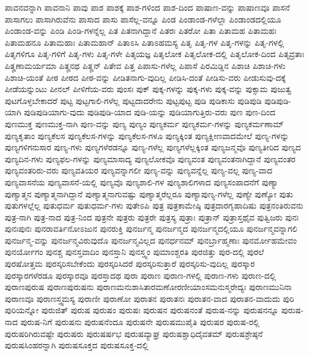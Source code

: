{ಪಾವನವನ್ನಾಗಿ
ಪಾವನಾನಿ
ಪಾವು
ಪಾಶ
ಪಾಶಕ್ಕೆ
ಪಾಶ-ಗಳಿಂದ
ಪಾಶ-ದಿಂದ
ಪಾಷಾಣ-ವನ್ನು
ಪಾಷಾಣವೂ
ಪಾಸನೆ
ಪಾಸಾಗಲು
ಪಾಸಾಗಿರುವೆನು
ಪಾಸಾದ
ಪಾಸು
ಪಾಸೆಲ್ಲ-ವನ್ನೂ
ಪಿಂಡ
ಪಿಂಡಾಂಡ-ಗಳೆಲ್ಲಾ
ಪಿಂಡಾಂಡದಲ್ಲಿಯೂ
ಪಿಂಡಾಂಡ-ವನ್ನು
ಪಿಂಡಿ
ಪಿಂಡಿ-ಗಳನ್ನೆಲ್ಲ
ಪಿತ
ಪಿತನಾಗಿದ್ದಾನೆ
ಪಿತರಃ
ಪಿತರೋ
ಪಿತಾ
ಪಿತಾಮಹ
ಪಿತಾಮಹಃ
ಪಿತಾಮಹನೂ
ಪಿತಾಮಹಾಃ
ಪಿತಾಮಹಾನ್
ಪಿತಾಽಸಿ
ಪಿತಾಽಹಮಸ್ಯ
ಪಿತೃ
ಪಿತೃ-ಗಳ
ಪಿತೃ-ಗಳನ್ನು
ಪಿತೃ-ಗಳಲ್ಲಿ
ಪಿತೃಗಳಿಗೂ
ಪಿತೃ-ಗಳಿಗೆ
ಪಿತೃ-ಗಳು
ಪಿತೃ-ಗಳೇ
ಪಿತೃಯಜ್ಞ
ಪಿತೃಲೋಕ
ಪಿತೃಲೋಕ-ದಲ್ಲಿ
ಪಿತೃಲೋಕ-ದಿಂದ
ಪಿತೃವ್ರತಾಃ
ಪಿತೄಣಾಮರ್ಯಮಾ
ಪಿತೄನಥ
ಪಿತೄನ್
ಪಿತೇವ
ಪಿತ್ತ
ಪಿಪಾಸು-ಗಳೆಲ್ಲ
ಪಿಪಾಸೆ
ಪಿರಮಿಡ್ಡಿನ
ಪಿಶಾಚಿ
ಪಿಶಾಚಿ-ಗಳು
ಪಿಶಾಚಿ-ಯಂತೆ
ಪೀಠ
ಪೀಠದ
ಪೀಠ-ವನ್ನು
ಪೀಡಿತನಾಗು-ವುದಿಲ್ಲ
ಪೀಡಿಸಿ-ದಂತೆ
ಪೀಡಿಸು-ವರು
ಪೀಡುಸುವು-ದಕ್ಕೆ
ಪೀಡೆಯನ್ನುಂಟು
ಪೀನಲ್
ಪೀಳಿಗೆಯ-ವರು
ಪುಂಸಃ
ಪುಕ್
ಪುಕ್ಕ-ಗಳನ್ನು
ಪುಕ್ಕ-ಗಳು
ಪುಕ್ಕ-ವನ್ನು
ಪುಕ್ಸಾಮ
ಪುಜುತ್ವ
ಪುಟಗೊಳ್ಳಬೇಕಾದರೆ
ಪುಟ್ಟ
ಪುಟ್ಟಗಾಲಿ-ಗಳೆಲ್ಲ
ಪುಟ್ಟದಾದರೇನು
ಪುಟ್ಟಪುಟ್ಟ
ಪುಡಿ
ಪುಡಿಕಾಸು
ಪುಡಿಪುಡಿ
ಪುಡಿಪುಡಿ-ಯಾಗಿ
ಪುಡಿಪುಡಿಯಾಗು-ವುದು
ಪುಡಿಪುಡಿ-ಯಾದ
ಪುಡಿ-ಯನ್ನು
ಪುಡಿಯಾಗುತ್ತಿರು-ವರು
ಪುಣ
ಪುಣ-ದಿಂದ
ಪುಣಮುಕ್ತ
ಪುಣಮುಕ್ತ-ನಾಗಿ
ಪುಣ-ವನ್ನು
ಪುಣ್ಯ
ಪುಣ್ಯಂ
ಪುಣ್ಯಕರ್ಮ
ಪುಣ್ಯಕರ್ಮ-ಗಳನ್ನು
ಪುಣ್ಯಕರ್ಮಣಾಮ್
ಪುಣ್ಯಕೃತಾಂ
ಪುಣ್ಯಕೆಲಸ
ಪುಣ್ಯಕೆಲಸ-ಗಳನ್ನು
ಪುಣ್ಯಕೆಲಸ-ಗಳೂ
ಪುಣ್ಯಕ್ಕಿಂತ
ಪುಣ್ಯಕ್ಷೀಣವಾದಮೇಲೆ
ಪುಣ್ಯ-ಗಳನ್ನು
ಪುಣ್ಯಗಳಿಗನುಸಾರ
ಪುಣ್ಯ-ಗಳು
ಪುಣ್ಯಗಳೆರಡನ್ನೂ
ಪುಣ್ಯ-ಗಳೆಲ್ಲ
ಪುಣ್ಯಗಳೆಲ್ಲಕ್ಕಿಂತ
ಪುಣ್ಯಜನ್ಮವೊ
ಪುಣ್ಯತೀರಿದ
ಪುಣ್ಯದ
ಪುಣ್ಯದಿನ-ಗಳು
ಪುಣ್ಯಫಲ-ಗಳನ್ನು
ಪುಣ್ಯಮಾಸಾದ್ಯ
ಪುಣ್ಯಲೋಕವೊ
ಪುಣ್ಯವಂತ
ಪುಣ್ಯವಂತನಾಗಿದ್ದಾನೆ
ಪುಣ್ಯವಂತರ
ಪುಣ್ಯವಂತರಿರು-ವರು
ಪುಣ್ಯವತಿಯರ
ಪುಣ್ಯವನ್ನಾಗಲೀ
ಪುಣ್ಯ-ವನ್ನು
ಪುಣ್ಯವನ್ನೆಲ್ಲ
ಪುಣ್ಯ-ವಲ್ಲ
ಪುಣ್ಯ-ವಾದ
ಪುಣ್ಯವಾಸನೆಯ
ಪುಣ್ಯವಾಸನೆ-ಯಲ್ಲಿ
ಪುಣ್ಯವೊ
ಪುಣ್ಯಶಾಲಿ-ಗಳ
ಪುಣ್ಯಶಾಲಿಗಳಾದ
ಪುಣ್ಯಸಂಪಾದನೆಗೆ
ಪುಣ್ಯಾ
ಪುಣ್ಯಾತ್ಮನ
ಪುಣ್ಯಾತ್ಮನಾಗಿದ್ದಾನೆ
ಪುಣ್ಯಾತ್ಮನಾಗುವಷ್ಟು
ಪುಣ್ಯಾತ್ಮರೆಲ್ಲರೂ
ಪುಣ್ಯಾಪುಣ್ಯ-ಗಳೆಲ್ಲ
ಪುಣ್ಯೇ
ಪುಣ್ಯೋ
ಪುತು
ಪುತುಗಳಲ್ಲೆಲ್ಲ
ಪುತುಧರ್ಮ
ಪುತುಧರ್ಮ-ಗಳು
ಪುತೇಽಪಿ
ಪುತ್ರ
ಪುತ್ರಕಾಮೇಷ್ಠಿ
ಪುತ್ರದಾರಗೃಹಾದಿಷು
ಪುತ್ರನಂತಿರುವನು
ಪುತ್ರ-ನಾಗಿ
ಪುತ್ರ-ನಾದ
ಪುತ್ರ-ನಿಂದ
ಪುತ್ರನೇ
ಪುತ್ರರು
ಪುತ್ರರೇ
ಪುತ್ರಸ್ಯ
ಪುತ್ರಾಃ
ಪುತ್ರಾನ್
ಪುತ್ರಾಸ್ತಥೈವ
ಪುತ್ವಿಜರು
ಪುನಃ
ಪುನಃಪುನಃ
ಪುನರಾವರ್ತಿನೋಽಜುನ
ಪುನರುಕ್ತಿ
ಪುನರ್ಜನ್ಮ
ಪುನರ್ಜನ್ಮದ
ಪುನರ್ಜನ್ಮದಲ್ಲಿಯೂ
ಪುನರ್ಜನ್ಮವನ್ನಾಗಲಿ
ಪುನರ್ಜನ್ಮ-ವನ್ನು
ಪುನರ್ಜನ್ಮವಿರುವುದೊ
ಪುನರ್ಜನ್ಮವಿಲ್ಲದ
ಪುನರ್ಧನಮ್
ಪುನರ್ಬ್ರಾಹ್ಮಣಾಃ
ಪುನರ್ಮೋಹಮೇವಂ
ಪುನರ್ಯೋಗಂ
ಪುನಶ್ಚ
ಪುನಸ್ತವಾದಿಂ
ಪುನಸ್ತಾನಿ
ಪುನಸ್ತ್ವಂ
ಪುಮಾಂಶ್ಚರತಿ
ಪುರಜಿತ್ತು
ಪುರ-ದಲ್ಲಿ
ಪುರಲೆ
ಪುರಷೋತ್ತಮ
ಪುರಸ್ಕರಿಸಬೇಕೆಂದು
ಪುರಸ್ಕರಿಸಿದರೆ
ಪುರಸ್ಕರಿಸುತ್ತಾರೆ
ಪುರಸ್ಕರಿಸು-ವುದಿಲ್ಲ
ಪುರಸ್ಕಾರ
ಪುರಸ್ಕಾರಗಳೆರಡೂ
ಪುರಸ್ಕಾರವೂ
ಪುರಸ್ತಾದಥ
ಪುರಾ
ಪುರಾಣ
ಪುರಾಣ-ಗಳಲ್ಲಿ
ಪುರಾಣ-ಗಳು
ಪುರಾಣ-ದಲ್ಲಿ
ಪುರಾಣಪುರುಷ
ಪುರಾಣಪುರುಷನು
ಪುರಾಣಮನುಶಾಸಿತಾರಮಣೋರಣೀಯಾಂಸಮನುಸ್ಮರೇದ್ಯಃ
ಪುರಾಣಮುನಿನಾ
ಪುರಾಣವೂ
ಪುರಾಣಸ್ತ್ವಮಸ್ಯ
ಪುರಾಣೀ
ಪುರಾಣೋ
ಪುರಾತನ
ಪುರಾತನಃ
ಪುರಾತನ-ವಾದ
ಪುರಾತನ-ವಾದುದು
ಪುರಿ
ಪುರಿಯನ್ನೋ
ಪುರುಜಿತ್
ಪುರುಷ
ಪುರುಷಂ
ಪುರುಷಃ
ಪುರುಷನ
ಪುರುಷನಂತೆ
ಪುರುಷ-ನನ್ನು
ಪುರುಷನನ್ನೂ
ಪುರುಷ-ನಾದ
ಪುರುಷ-ನಿಗೆ
ಪುರುಷನು
ಪುರುಷನೆಂದೂ
ಪುರುಷನೇ
ಪುರುಷಮುಪೈತಿ
ಪುರುಷರ
ಪುರುಷ-ರಲ್ಲಿ
ಪುರುಷರಿಗಿರುವಷ್ಟೇ
ಪುರುಷರು
ಪುರುಷರ್ಷಭ
ಪುರುಷವ್ಯಾಘ್ರ
ಪುರುಷಶ್ಚಾಧಿದೈವತಮ್
ಪುರುಷಶ್ರೇಷ್ಠನೆ
ಪುರುಷಸಿಂಹರನ್ನಾಗಿ
ಪುರುಷಸೂಕ್ತದ
ಪುರುಷಸೂಕ್ತ-ದಲ್ಲಿ
}
